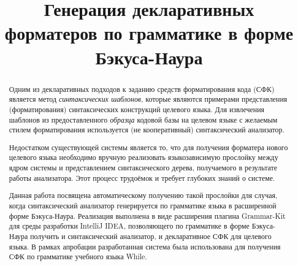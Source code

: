 \documentclass[conference]{IEEEtran}
\begin{document}
%
%
\title{Генерация декларативных форматеров по грамматике в форме Бэкуса-Наура}


\author{
\and
{}
}

\maketitle

\begin{abstract}
Одним из декларативных подходов к заданию средств форматирования кода (СФК)
является метод \emph{синтаксических шаблонов}, которые
являются примерами представления (форматирования) синтаксических
конструкций целевого языка.
Для извлечения шаблонов из предоставленного \emph{образца}
кодовой базы на целевом языке с желаемым стилем форматирования
используется (не кооперативный) синтаксический анализатор. 

Недостатком существующей системы является то, что 
для получения форматера нового целевого языка
необходимо вручную реализовать языкозависимую прослойку между ядром
системы и представлением синтаксического
дерева, получаемого в результате работы анализатора.
Этот процесс трудоёмок и требует глубоких знаний о системе.


Данная работа посвящена автоматическому получению такой прослойки
для случая, когда синтаксический анализатор генерируется
по грамматике языка в
расширенной форме Бэкуса-Наура.
Реализация выполнена в виде расширения плагина Grammar-Kit
для среды разработки IntelliJ IDEA, позволяющего
по грамматике в форме Бэкуса-Наура получить и синтаксический анализатор,
и декларативное СФК для целевого языка.
В рамках апробации разработанная система была использована
для получения СФК по грамматике учебного языка While.
\end{abstract}
\end{document}
